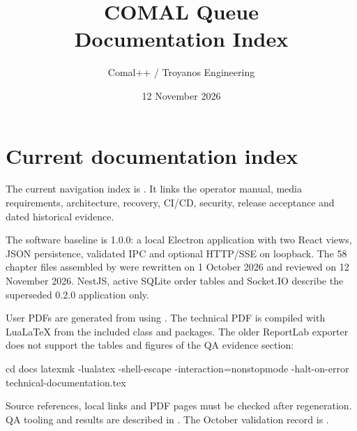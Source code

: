 \documentclass{ol-softwaremanual}
\title{COMAL Queue\\Documentation Index}
\author{Comal++ / Troyanos Engineering}
\date{12 November 2026}
\begin{document}
\maketitle
\section{Current documentation index}
The current navigation index is . It links the operator manual, media requirements, architecture, recovery, CI/CD, security, release acceptance and dated historical evidence.

The software baseline is 1.0.0: a local Electron application with two React views, JSON persistence, validated IPC and optional HTTP/SSE on loopback. The 58 chapter files assembled by  were rewritten on 1 October 2026 and reviewed on 12 November 2026. NestJS, active SQLite order tables and Socket.IO describe the superseded 0.2.0 application only.

User PDFs are generated from  using . The technical PDF is compiled with LuaLaTeX from the included class and packages. The older ReportLab exporter  does not support the tables and figures of the QA evidence section:
\begin{CodeBlock}
cd docs
latexmk -lualatex -shell-escape -interaction=nonstopmode -halt-on-error technical-documentation.tex
\end{CodeBlock}

Source references, local links and PDF pages must be checked after regeneration. QA tooling and results are described in . The October validation record is .
\end{document}
